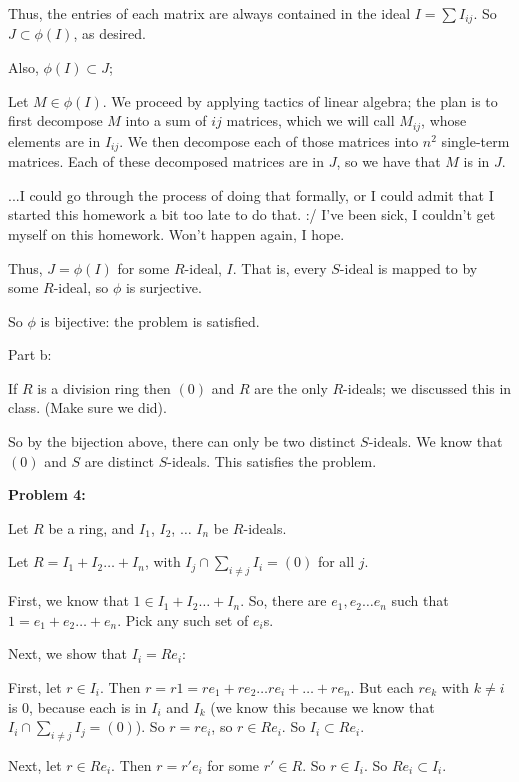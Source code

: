 \documentclass[a4paper,12pt]{article}
\newcommand{\tab}{\hspace{4mm}} %
\newcommand{\shunt}{\vspace{20mm}}
\begin{document}
\tab Thus, the entries of each matrix are always contained in the ideal $I = \sum I_{ij}$. So $J \subset \phi(I)$, as desired.

Also, $\phi(I) \subset J$;

\tab Let $M \in \phi(I)$. We proceed by applying tactics of linear algebra; the plan is to first decompose $M$ into a sum of $ij$ matrices, which we will call $M_{ij}$, whose elements are in $I_{ij}$. We then decompose each of those matrices into $n^2$ single-term matrices. Each of these decomposed matrices are in $J$, so we have that $M$ is in $J$.

\tab ...I could go through the process of doing that formally, or I could admit that I started this homework a bit too late to do that. :/ I've been sick, I couldn't get myself on this homework. Won't happen again, I hope.

Thus, $J = \phi(I)$ for some $R$-ideal, $I$. That is, every $S$-ideal is mapped to by some $R$-ideal, so $\phi$ is surjective.

So $\phi$ is bijective: the problem is satisfied.

\shunt

Part b:

If $R$ is a division ring then $(0)$ and $R$ are the only $R$-ideals; we discussed this in class. (Make sure we did).

So by the bijection above, there can only be two distinct $S$-ideals. We know that $(0)$ and $S$ are distinct $S$-ideals. This satisfies the problem.

\shunt

{\bf Problem 4:}

Let $R$ be a ring, and $I_1$, $I_2$, $\ldots$ $I_n$ be $R$-ideals.

Let $R=I_1 + I_2 \ldots +I_n$, with $I_j \cap \sum\limits_{i \neq j} I_i = (0)$ for all $j$.

\tab First, we know that $1 \in I_1 + I_2 \ldots +I_n$. So, there are $e_1, e_2 \ldots e_n$ such that $1 = e_1 + e_2 \ldots + e_n$. Pick any such set of $e_i$s.

\tab Next, we show that $I_i = Re_i$:

\tab \tab First, let $r \in I_i$. Then $r=r1=re_1+re_2 \ldots re_i + \ldots +re_n$. But each $re_k$ with $k \neq i$ is $0$, because each is in $I_i$ and $I_k$ (we know this because we know that $I_i \cap \sum\limits_{i \neq j} I_j = (0)$). So $r = re_i$, so $r \in Re_i$. So $I_i \subset Re_i$.

\tab \tab Next, let $r \in Re_i$. Then $r = r'e_i$ for some $r' \in R$. So $r \in I_i$. So $Re_i \subset I_i$.
\end{document}
